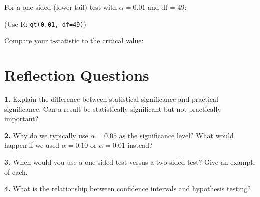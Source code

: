 \documentclass[11pt]{article}
\begin{document}
\vspace{0.3cm}

For a one-sided (lower tail) test with $\alpha = 0.01$ and df = 49:

(Use R: \texttt{qt(0.01, df=49)})

\vspace{1cm}

Compare your t-statistic to the critical value:

\vspace{3cm}

\newpage

\section*{Reflection Questions}

\textbf{1.} Explain the difference between statistical significance and practical significance. Can a result be statistically significant but not practically important?

\vspace{4cm}

\textbf{2.} Why do we typically use $\alpha = 0.05$ as the significance level? What would happen if we used $\alpha = 0.10$ or $\alpha = 0.01$ instead?

\vspace{4cm}

\textbf{3.} When would you use a one-sided test versus a two-sided test? Give an example of each.

\vspace{4cm}

\textbf{4.} What is the relationship between confidence intervals and hypothesis testing?

\vspace{4cm}
\end{document}

